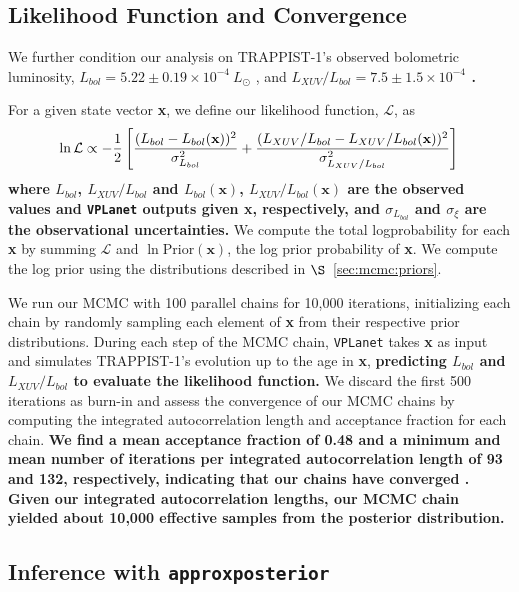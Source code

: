 \documentclass[twocolumn]{aastex62}
\newcommand{\xxx}[1]{{\textbf{#1}}}
\newcommand{\vplanet}[0]{\texttt{VPLanet}\xspace}
\newcommand{\approxposterior}[0]{\texttt{approxposterior}\xspace}
\begin{document}
\subsection{Likelihood Function and Convergence} \label{sec:mcmc:like}

We further condition our analysis on TRAPPIST-1's observed bolometric luminosity, $L_{bol} = 5.22 \pm{0.19} \times 10^{-4} \ L_{\odot}$ \citep{vanGrootel2018}, and \xxx{$L_{XUV}/L_{bol} = 7.5 \pm{1.5} \times 10^{-4}$ \citep{Wheatley2017}.} 

For a given state vector \textbf{x}, we define our likelihood function, $\mathcal{L}$, as
\small
\begin{equation} \label{eqn:lnlike}
    \ln \mathcal{L} \propto -\frac{1}{2} \left[ \frac{(L_{bol} - L_{bol}(\textbf{x}))^2}{\sigma_{L_{bol}}^2} + \frac{(L_{XUV}/L_{bol} - L_{XUV}/L_{bol}(\textbf{x}))^2}{\sigma_{L_{XUV}/L_{bol}}^2} \right] \\
\end{equation}
\normalsize
\xxx{where $L_{bol}$, $L_{XUV}/L_{bol}$ and $L_{bol}(\textbf{x})$, $L_{XUV}/L_{bol}(\textbf{x})$ are the observed values and \vplanet outputs given \textbf{x}, respectively, and $\sigma_{L_{bol}}$ and $\sigma_{\xi}$ are the observational uncertainties.} We compute the total logprobability for each \textbf{x} by summing $\mathcal{L}$ and $\ln \mathrm{Prior}(\textbf{x})$, the log prior probability of \textbf{x}. We compute the log prior using the distributions described in $\S$~\ref{sec:mcmc:priors}. 

We run our MCMC with 100 parallel chains for 10,000 iterations, initializing each chain by randomly sampling each element of \textbf{x} from their respective prior distributions. During each step of the MCMC chain, \vplanet takes \textbf{x} as input and simulates TRAPPIST-1's evolution up to the age in \textbf{x}, \xxx{predicting $L_{bol}$ and $L_{XUV}/L_{bol}$ to evaluate the likelihood function.} We discard the first 500 iterations as burn-in and assess the convergence of our MCMC chains by computing the integrated autocorrelation length and acceptance fraction for each chain. \xxx{We find a mean acceptance fraction of 0.48 and a minimum and mean number of iterations per integrated autocorrelation length of 93 and 132, respectively, indicating that our chains have converged \citep{ForemanMackey2013}. Given our integrated autocorrelation lengths, our MCMC chain yielded about 10,000 effective samples from the posterior distribution.}

\subsection{Inference with \approxposterior} \label{sec:methods:approx}
\end{document}
